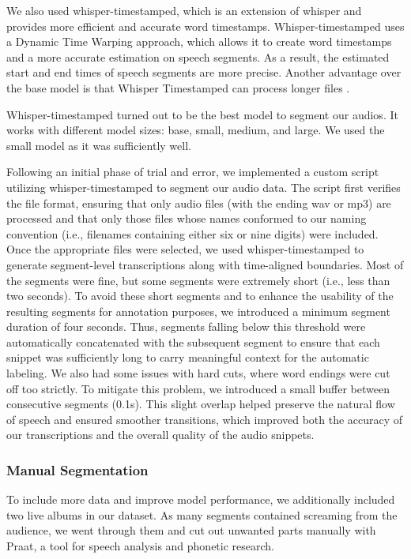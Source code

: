 \documentclass[a4paper]{article}
\begin{document}
	We also used whisper-timestamped, which is an extension of whisper and provides more efficient and accurate word timestamps. Whisper-timestamped uses a Dynamic Time Warping approach, which allows it to create word timestamps and a more accurate estimation on speech segments. As a result, the estimated start and end times of speech segments are more precise. Another advantage over the base model is that Whisper Timestamped can process longer files \cite{Andreyev2025}.
	
	Whisper-timestamped turned out to be the best model to segment our audios. It works with different model sizes: base, small, medium, and large. We used the small model as it was sufficiently well.
	
	Following an initial phase of trial and error, we implemented a custom script utilizing whisper-timestamped to segment our audio data. The script first verifies the file format, ensuring that only audio files (with the ending wav or mp3) are processed and that only those files whose names conformed to our naming convention (i.e., filenames containing either six or nine digits) were included. Once the appropriate files were selected, we used whisper-timestamped to generate segment-level transcriptions along with time-aligned boundaries. Most of the segments were fine, but some segments were extremely short (i.e., less than two seconds). To avoid these short segments and to enhance the usability of the resulting segments for annotation purposes, we introduced a minimum segment duration of four seconds. Thus, segments falling below this threshold were automatically concatenated with the subsequent segment to ensure that each snippet was sufficiently long to carry meaningful context for the automatic labeling. We also had some issues with hard cuts, where word endings were cut off too strictly. To mitigate this problem, we introduced a small buffer between consecutive segments (0.1s). This slight overlap helped preserve the natural flow of speech and ensured smoother transitions, which improved both the accuracy of our transcriptions and the overall quality of the audio snippets.
	
	
	\subsubsection{Manual Segmentation}
	
	To include more data and improve model performance, we additionally included two live albums in our dataset. As many segments contained screaming from the audience, we went through them and cut out unwanted parts manually with Praat, a tool for speech analysis and phonetic research.
	
\end{document}

